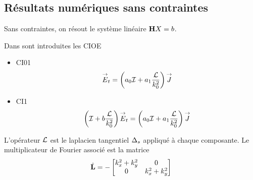   \subsection{Résultats numériques sans contraintes}

      Sans contraintes, on résout le système linéaire \(\mathbf{H} X = b\). 


      Dans \cite{stupfel_implementation_2015} sont introduites les CIOE
      \begin{itemize}
        \item CI01
          \begin{equation}
            {\overset{\rightarrow}{E}}_t = \left(a_0{\mathcal{I}} + a_1\dfrac{\mathcal{L}}{k_0^2}\right){\overset{\rightarrow}{J}}
          \end{equation}
        \item CI1
          \begin{equation}
            \left({\mathcal{I}} + b\dfrac{\mathcal{L}}{k_0^2} \right){\overset{\rightarrow}{E}}_t = \left(a_0{\mathcal{I}} + a_1\dfrac{\mathcal{L}}{k_0^2}\right){\overset{\rightarrow}{J}}
          \end{equation}
      \end{itemize}

      L'opérateur \(\mathcal{L}\) est le laplacien tangentiel \(\Delta_s\) appliqué à chaque composante. Le multiplicateur de Fourier associé est la matrice
      \begin{equation}
        \hat{\mathbf{L}}  = -
        \begin{bmatrix}
          k_x^2 + k_y^2 & 0
          \\
          0 & k_x^2 + k_y^2
        \end{bmatrix}
      \end{equation}

